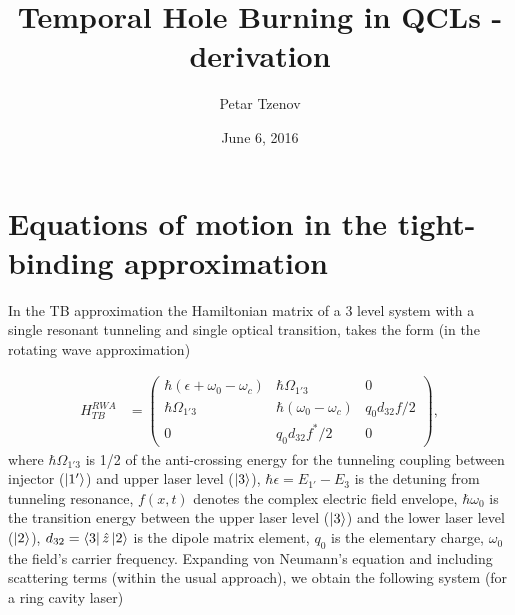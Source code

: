 \documentclass[]{spie}  %
\title{Temporal Hole Burning in QCLs - derivation}
\author[a]{Petar Tzenov}
\date{June 6, 2016}%
\def\h{\hat}
\def\h{\hat}
\begin{document}
 
\maketitle
 
 
 
\section{Equations of motion in the tight-binding approximation}

In the TB approximation the Hamiltonian matrix of a 3 level system with a single resonant tunneling and single optical transition, takes the form (in the rotating wave approximation)

\begin{align}
\label{eq:hamiltonian-matrixform}
H_{TB}^{RWA} &= \begin{pmatrix}
\hbar(\epsilon + \omega_{0} -\omega_c) & \hbar \Omega_{1'3} & 0 \\ 
\hbar \Omega_{1'3} & \hbar(\omega_{0} -\omega_c) & q_0d_{32}f/2 \\
0 & q_0d_{32}f^*/2 & 0
\end{pmatrix},
\end{align}
where $\hbar \Omega_{1'3}$ is 1/2 of the anti-crossing energy for the tunneling coupling between injector ($\ket{1'}$) and upper laser level ($\ket{3}$), $\hbar\epsilon = E_{1'}-E_{3}$ is the detuning from tunneling resonance, $f(x,t)$ denotes the complex electric field envelope, $\hbar\omega_{0}$ is the transition energy between the upper laser level ($\ket{3}$) and the lower laser level ($\ket{2}$), $d_{32} = \bra{3}\h{z}\ket{2}$ is the dipole matrix element, $q_0$ is the elementary charge, $\omega_0$ the field's carrier frequency. Expanding von Neumann's equation and including scattering terms (within the usual approach), we obtain the following system (for a ring cavity laser)
\end{document}
